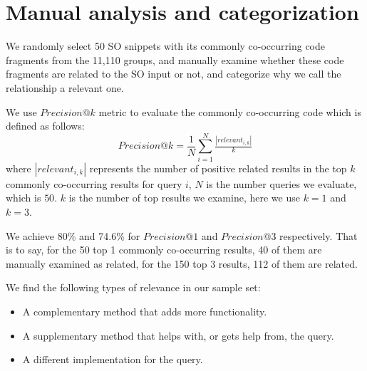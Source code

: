%
%
%
%

\section{Manual analysis and categorization}
\label{sec:eval}

We randomly select 50 SO snippets with its commonly co-occurring code fragments from the 11,110 groups, and manually examine whether these code fragments are related to the SO input or not, and categorize why we call the relationship a relevant one.

We use $Precision@k$ metric to evaluate the commonly co-occurring code  which is defined as follows:
\begin{equation}
Precision@k = \frac{1}{N}\sum_{i=1}^{N}\tfrac{\left | relevant_{i,k} \right |}{k}
\end{equation}
where $\left | relevant_{i,k} \right |$ represents the number of positive related results in the top $k$ commonly co-occurring results for query $i$, $N$ is the number queries we evaluate, which is $50$. $k$ is the number of top results we examine, here we use $k=1$ and $k=3$.

We achieve 80\% and 74.6\% for $Precision@1$ and $Precision@3$ respectively. That is to say, for the 50 top 1 commonly co-occurring results, 40 of them are manually examined as related, for the 150 top 3 results, 112 of them are related.

We find the following types of relevance in our sample set:
\begin{itemize}
	\item A complementary method that adds more functionality.
	\item A supplementary method that helps with, or gets help from, the query. 
	\item A different implementation for the query.	
\end{itemize}


